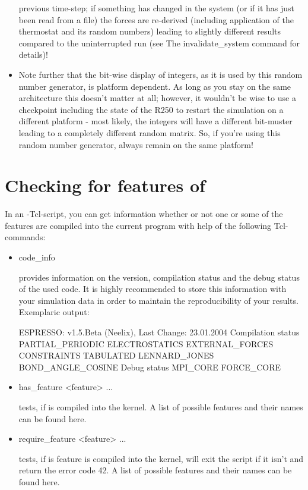 \begin{itemize}
previous time-step; if something has changed in the system (or if it
has just been read from a file) the forces are re-derived (including
application of the thermostat and its random numbers) leading to
slightly different results compared to the uninterrupted run (see The
invalidate\_system command for details)!
\item Note further that the bit-wise display of integers, as it is
  used by this random number generator, is platform dependent. As long
  as you stay on the same architecture this doesn't matter at all;
  however, it wouldn't be wise to use a checkpoint including the state
  of the R250 to restart the simulation on a different platform - most
  likely, the integers will have a different bit-muster leading to a
  completely different random matrix.  So, if you're using this random
  number generator, always remain on the same platform!
\end{itemize}


\section{Checking for features of \es}

In an \es-Tcl-script, you can get information whether or not one or
some of the features are compiled into the current program with help
of the following Tcl-commands:
\begin{itemize}
 \item
\begin{code}
code\_info
\end{code}
provides information on the version, compilation status and the debug
status of the used code. It is highly recommended to store this
information with your simulation data in order to maintain the
reproducibility of your results.  Exemplaric output:
\begin{tclcode}
ESPRESSO: v1.5.Beta (Neelix), Last Change: 23.01.2004
{ Compilation status { PARTIAL_PERIODIC } { ELECTROSTATICS }
{ EXTERNAL_FORCES } { CONSTRAINTS } { TABULATED }
{ LENNARD_JONES } { BOND_ANGLE_COSINE } }
{ Debug status { MPI_CORE FORCE_CORE } }
\end{tclcode}
 \item
\begin{code}
has\_feature <feature> ...
\end{code}
tests, if  is compiled into the \es{} kernel. A list of
possible features and their names can be found here.
\item
\begin{code}
  require\_feature <feature> ...
\end{code}
tests, if  is feature is compiled into the \es{} kernel,
will exit the script if it isn't and return the error code 42. A list
of possible features and their names can be found here.
\end{itemize}


